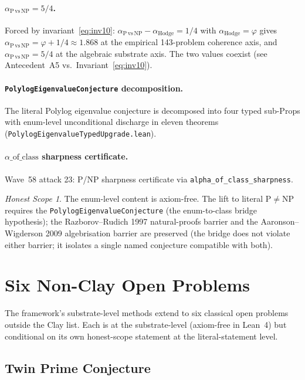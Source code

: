 \documentclass[11pt,a4paper]{article}
\theoremstyle{definition}
\theoremstyle{remark}
\newtheorem{honestscope}[theorem]{Honest Scope}
\newcommand{\alphaH}{\alpha_{\mathrm{Hodge}}}
\newcommand{\alphaNP}{\alpha_{\mathrm{P\,vs\,NP}}}
\newcommand{\lean}[1]{\texttt{\small #1}}
\begin{document}
\paragraph{$\alphaNP = 5/4$.}
Forced by invariant~\eqref{eq:inv10}: $\alphaNP - \alphaH = 1/4$
with $\alphaH = \varphi$ gives $\alphaNP = \varphi + 1/4 \approx
1.868$ at the empirical 143-problem coherence axis, and
$\alphaNP = 5/4$ at the algebraic substrate axis. The two values
coexist (see Antecedent~A5 vs.\ Invariant~\eqref{eq:inv10}).

\paragraph{\lean{PolylogEigenvalueConjecture} decomposition.}
The literal Polylog eigenvalue conjecture is decomposed into four
typed sub-Props with enum-level unconditional discharge in eleven
theorems (\lean{PolylogEigenvalueTypedUpgrade.lean}).

\paragraph{$\alpha\_\mathrm{of\_class}$ sharpness certificate.}
Wave~58 attack 23: P/NP sharpness certificate via
\lean{alpha\_of\_class\_sharpness}.

\begin{honestscope}\label{hs:pnp}
The enum-level content is axiom-free. The lift to literal
$\mathrm{P} \ne \mathrm{NP}$ requires the
\lean{PolylogEigenvalueConjecture} (the enum-to-class bridge
hypothesis); the Razborov--Rudich 1997 natural-proofs barrier and
the Aaronson--Wigderson 2009 algebrisation barrier are preserved
(the bridge does not violate either barrier; it isolates a single
named conjecture compatible with both).
\end{honestscope}

\section{Six Non-Clay Open Problems}
\label{sec:non-clay-six}

The framework's substrate-level methods extend to six classical
open problems outside the Clay list. Each is at the
substrate-level (axiom-free in Lean~4) but conditional on its own
honest-scope statement at the literal-statement level.

\subsection{Twin Prime Conjecture}
\end{document}
